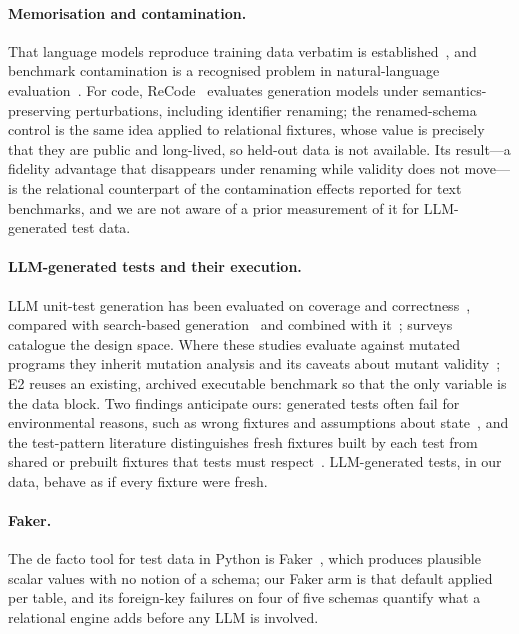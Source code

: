 \documentclass[preprint,12pt]{elsarticle}
\begin{document}
\paragraph{Memorisation and contamination.} That language models reproduce training data verbatim is established~\cite{carlini2021extracting}, and benchmark contamination is a recognised problem in natural-language evaluation~\cite{magar2022contamination,sainz2023contamination}. For code, ReCode~\cite{wang2023recode} evaluates generation models under semantics-preserving perturbations, including identifier renaming; the renamed-schema control is the same idea applied to relational fixtures, whose value is precisely that they are public and long-lived, so held-out data is not available. Its result---a fidelity advantage that disappears under renaming while validity does not move---is the relational counterpart of the contamination effects reported for text benchmarks, and we are not aware of a prior measurement of it for LLM-generated test data.

\paragraph{LLM-generated tests and their execution.} LLM unit-test generation has been evaluated on coverage and correctness~\cite{schafer2024testpilot,siddiq2024junit,yuan2024chattester}, compared with search-based generation~\cite{tang2024chatgptsbst} and combined with it~\cite{lemieux2023codamosa}; surveys~\cite{wang2024survey} catalogue the design space. Where these studies evaluate against mutated programs they inherit mutation analysis and its caveats about mutant validity~\cite{just2014mutants,papadakis2019mutation}; E2 reuses an existing, archived executable benchmark so that the only variable is the data block. Two findings anticipate ours: generated tests often fail for environmental reasons, such as wrong fixtures and assumptions about state~\cite{schafer2024testpilot,yuan2024chattester}, and the test-pattern literature distinguishes fresh fixtures built by each test from shared or prebuilt fixtures that tests must respect~\cite{meszaros2007xunit}. LLM-generated tests, in our data, behave as if every fixture were fresh.

\paragraph{Faker.} The de facto tool for test data in Python is Faker~\cite{faker}, which produces plausible scalar values with no notion of a schema; our Faker arm is that default applied per table, and its foreign-key failures on four of five schemas quantify what a relational engine adds before any LLM is involved.
\end{document}
